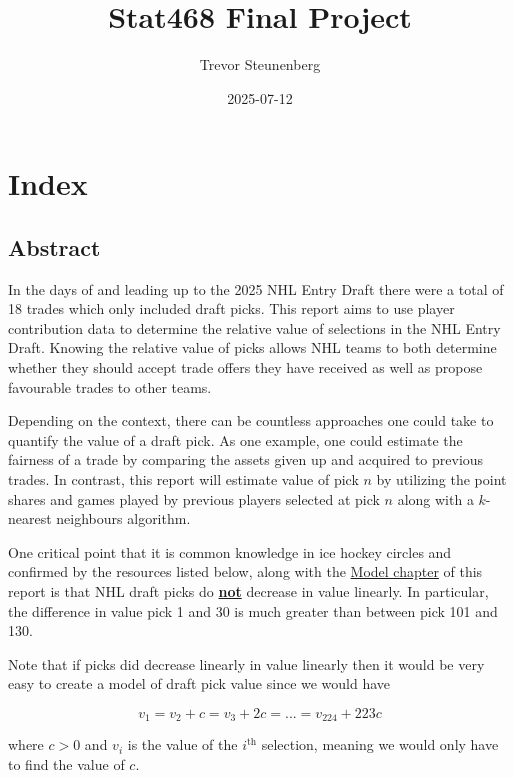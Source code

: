 \documentclass[
  letterpaper,
  DIV=11,
  numbers=noendperiod]{scrreprt}
\title{Stat468 Final Project}
\author{Trevor Steunenberg}
\date{2025-07-12}
\renewcommand*\contentsname{Table of contents}
\newcommand\contentsname{Table of contents}
\begin{document}
\maketitle

\renewcommand*\contentsname{Table of contents}
{
\hypersetup{linkcolor=}
\setcounter{tocdepth}{2}
\tableofcontents
}

\chapter{Index}\label{index}

\section{Abstract}\label{abstract}

In the days of and leading up to the 2025 NHL Entry Draft there were a
total of 18 trades which only included draft picks. This report aims to
use player contribution data to determine the relative value of
selections in the NHL Entry Draft. Knowing the relative value of picks
allows NHL teams to both determine whether they should accept trade
offers they have received as well as propose favourable trades to other
teams.

Depending on the context, there can be countless approaches one could
take to quantify the value of a draft pick. As one example, one could
estimate the fairness of a trade by comparing the assets given up and
acquired to previous trades. In contrast, this report will estimate
value of pick \(n\) by utilizing the point shares and games played by
previous players selected at pick \(n\) along with a \(k\)-nearest
neighbours algorithm.

One critical point that it is common knowledge in ice hockey circles and
confirmed by the resources listed below, along with the
\href{https://trevsteu.github.io/Stat468_Final/model.html}{Model
chapter} of this report is that NHL draft picks do \ul{\textbf{not}}
decrease in value linearly. In particular, the difference in value pick
1 and 30 is much greater than between pick 101 and 130.

Note that if picks did decrease linearly in value linearly then it would
be very easy to create a model of draft pick value since we would have

\[ v_1 = v_2 + c = v_3 + 2c = ... = v_{224} + 223c \]

where \(c > 0\) and \(v_i\) is the value of the \(i^{\text{th}}\)
selection, meaning we would only have to find the value of \(c\).
\end{document}
